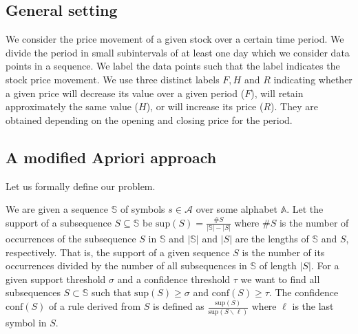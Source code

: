\documentclass{llncs}
\begin{document}
\subsection*{General setting}
We consider the price movement of a given stock over a certain time period. We divide the period in small subintervals of at least one day which we consider data points in a sequence.  
We label the data points such that the label indicates the stock price movement. We use three distinct labels $F, H$ and $R$ indicating whether a given price will decrease its value over a given period ($F$), will retain approximately the same value ($H$), or will increase its price ($R$). They are obtained depending on the opening and closing price for the period. 
\subsection*{A modified Apriori approach}
Let us formally define our problem.

We are given a sequence $\mathbb{S}$ of symbols $s \in \mathcal{A}$ over some alphabet $\mathbb{A}$. Let the support of a subsequence $S \subseteq \mathbb{S}$ be $\mbox{sup}(S) = \frac{\#S}{|\mathbb{S}| - |S|}$ where $\#S$ is the number of occurrences of the subsequence $S$ in $\mathbb{S}$ and $|\mathbb{S}|$ and $|S|$ are the lengths of $\mathbb{S}$ and $S$, respectively. That is, the support of a given sequence $S$ is the number of its occurrences divided by the number of all subsequences in $\mathbb{S}$ of length $|S|$.  For a given support threshold $\sigma$ and a confidence threshold $\tau$ we want to find all subsequences $S \subset \mathbb{S}$ such that $\mbox{sup}(S) \geq \sigma$ and $\mbox{conf}(S) \geq \tau$. The confidence $\mbox{conf}(S)$ of a rule derived from $S$ is defined as $\frac{\mbox{sup}(S)}{\mbox{sup}(S\backslash\ell)}$ where $\ell$ is the last symbol in $S$.
\end{document}
